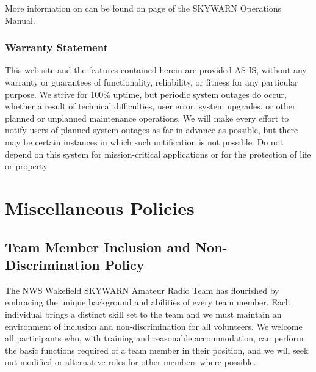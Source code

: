 \documentclass[pdflatex,letterpaper,twoside,12pt]{book}
\begin{document}
More information on  can be found on page \pageref{reporting-criteria} of the SKYWARN Operations Manual.

\subsection{Warranty Statement}

This web site and the features contained herein are provided AS-IS, without any warranty or guarantees of functionality, reliability, or fitness for any particular purpose. We strive for 100\% uptime, but periodic system outages do occur, whether a result of technical difficulties, user error, system upgrades, or other planned or unplanned maintenance operations. We will make every effort to notify users of planned system outages as far in advance as possible, but there may be certain instances in which such notification is not possible. Do not depend on this system for mission-critical applications or for the protection of life or property.


\chapter{Miscellaneous Policies}


\section{Team Member Inclusion and Non-Discrimination Policy}

The NWS Wakefield SKYWARN Amateur Radio Team has flourished by embracing the unique background and abilities of every team member. Each individual brings a distinct skill set to the team and we must maintain an environment of inclusion and non-discrimination for all volunteers. We welcome all participants who, with training and reasonable accommodation, can perform the basic functions required of a team member in their position, and we will seek out modified or alternative roles for other members where possible.
\end{document}
